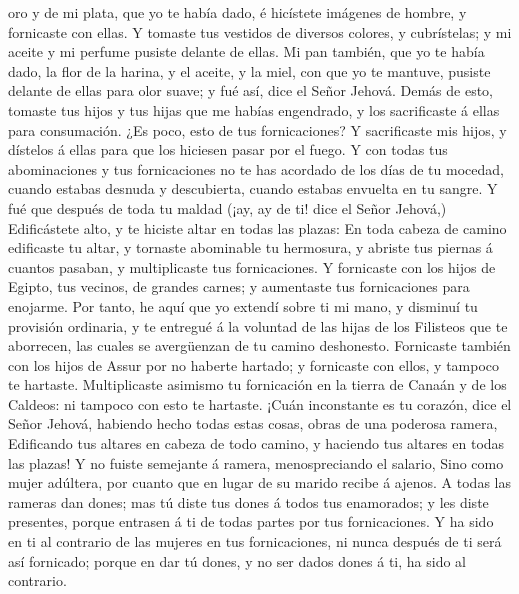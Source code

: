 oro y de mi plata, que yo te había dado, é hicístete imágenes de hombre,
y fornicaste con ellas.  Y tomaste tus vestidos de
diversos colores, y cubrístelas; y mi aceite y mi perfume pusiste
delante de ellas.  Mi pan también, que yo te había dado,
la flor de la harina, y el aceite, y la miel, con que yo te mantuve,
pusiste delante de ellas para olor suave; y fué así, dice el Señor
Jehová.  Demás de esto, tomaste tus hijos y tus hijas que
me habías engendrado, y los sacrificaste á ellas para consumación. ¿Es
poco, esto de tus fornicaciones?  Y sacrificaste mis
hijos, y dístelos á ellas para que los hiciesen pasar por el fuego.
 Y con todas tus abominaciones y tus fornicaciones no te
has acordado de los días de tu mocedad, cuando estabas desnuda y
descubierta, cuando estabas envuelta en tu sangre.  Y fué
que después de toda tu maldad (¡ay, ay de ti! dice el Señor Jehová,)
 Edificástete alto, y te hiciste altar en todas las
plazas:  En toda cabeza de camino edificaste tu altar, y
tornaste abominable tu hermosura, y abriste tus piernas á cuantos
pasaban, y multiplicaste tus fornicaciones.  Y fornicaste
con los hijos de Egipto, tus vecinos, de grandes carnes; y aumentaste
tus fornicaciones para enojarme.  Por tanto, he aquí que
yo extendí sobre ti mi mano, y disminuí tu provisión ordinaria, y te
entregué á la voluntad de las hijas de los Filisteos que te aborrecen,
las cuales se avergüenzan de tu camino deshonesto. 
Fornicaste también con los hijos de Assur por no haberte hartado; y
fornicaste con ellos, y tampoco te hartaste. 
Multiplicaste asimismo tu fornicación en la tierra de Canaán y de los
Caldeos: ni tampoco con esto te hartaste.  ¡Cuán
inconstante es tu corazón, dice el Señor Jehová, habiendo hecho todas
estas cosas, obras de una poderosa ramera,  Edificando
tus altares en cabeza de todo camino, y haciendo tus altares en todas
las plazas! Y no fuiste semejante á ramera, menospreciando el salario,
 Sino como mujer adúltera, por cuanto que en lugar de su
marido recibe á ajenos.  A todas las rameras dan dones;
mas tú diste tus dones á todos tus enamorados; y les diste presentes,
porque entrasen á ti de todas partes por tus fornicaciones.
 Y ha sido en ti al contrario de las mujeres en tus
fornicaciones, ni nunca después de ti será así fornicado; porque en dar
tú dones, y no ser dados dones á ti, ha sido al contrario.
